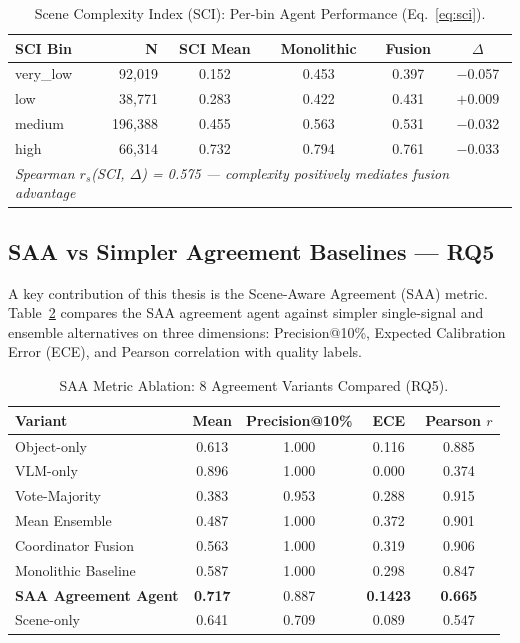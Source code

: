 \documentclass[12pt,onecolumn,a4paper]{IEEEtran}
\begin{document}
\begin{table}[!htbp]
\centering
\caption{Scene Complexity Index (SCI): Per-bin Agent Performance (Eq.~\ref{eq:sci}).}
\label{tab:sci_bins}
\begin{tabular}{lrcccc}
\toprule
SCI Bin & N & SCI Mean & Monolithic & Fusion & $\Delta$ \\
\midrule
very\_low & 92,019 & 0.152 & 0.453 & 0.397 & $-$0.057 \\
low       & 38,771 & 0.283 & 0.422 & 0.431 & $\mathbf{+0.009}$ \\
medium    & 196,388 & 0.455 & 0.563 & 0.531 & $-$0.032 \\
high      & 66,314 & 0.732 & 0.794 & 0.761 & $-$0.033 \\
\midrule
\multicolumn{6}{l}{\textit{Spearman $r_s$(SCI, $\Delta$) = 0.575 — complexity positively mediates fusion advantage}} \\
\bottomrule
\end{tabular}
\end{table}

\subsection{SAA vs Simpler Agreement Baselines — RQ5}
\label{sec:saa_ablation}

A key contribution of this thesis is the Scene-Aware Agreement (SAA) metric. Table~\ref{tab:saa_ablation} compares the SAA agreement agent against simpler single-signal and ensemble alternatives on three dimensions: Precision@10\%, Expected Calibration Error (ECE), and Pearson correlation with quality labels.

\begin{table}[!htbp]
\centering
\caption{SAA Metric Ablation: 8 Agreement Variants Compared (RQ5).}
\label{tab:saa_ablation}
\begin{tabular}{lcccc}
\toprule
Variant & Mean & Precision@10\% & ECE & Pearson $r$ \\
\midrule
Object-only                & 0.613 & 1.000 & 0.116 & 0.885 \\
VLM-only                   & 0.896 & 1.000 & 0.000 & 0.374 \\
Vote-Majority              & 0.383 & 0.953 & 0.288 & 0.915 \\
Mean Ensemble              & 0.487 & 1.000 & 0.372 & 0.901 \\
Coordinator Fusion         & 0.563 & 1.000 & 0.319 & 0.906 \\
Monolithic Baseline        & 0.587 & 1.000 & 0.298 & 0.847 \\
\textbf{SAA Agreement Agent} & \textbf{0.717} & 0.887 & \textbf{0.1423} & \textbf{0.665} \\
Scene-only                 & 0.641 & 0.709 & 0.089 & 0.547 \\
\bottomrule
\end{tabular}
\end{table}
\end{document}
